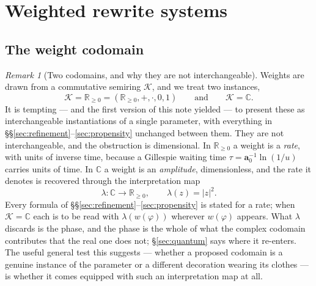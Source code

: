 \documentclass[11pt,a4paper]{article}
\theoremstyle{plain}
\theoremstyle{definition}
\theoremstyle{remark}
\newtheorem{remark}[theorem]{Remark}
\newcommand{\Rnn}{\mathbb{R}_{\geq 0}}
\newcommand{\Cx}{\mathbb{C}}
\newcommand{\prop}{\mathbf{a}}
\newcommand{\wmap}{w}
\begin{document}
\section{Weighted rewrite systems}
\label{sec:weighted}

\subsection{The weight codomain}

\begin{remark}[Two codomains, and why they are not interchangeable]
\label{rem:codomain}
Weights are drawn from a commutative semiring $\mathcal{K}$, and we treat two instances,
\[
\mathcal{K} = \Rnn = (\Rnn, +, \cdot, 0, 1)
\qquad\text{and}\qquad
\mathcal{K} = \Cx .
\]
It is tempting --- and the first version of this note yielded --- to present these as interchangeable
instantiations of a single parameter, with everything in
\S\S\ref{sec:refinement}--\ref{sec:propensity} unchanged between them. They are not interchangeable,
and the obstruction is dimensional. In $\Rnn$ a weight is a \emph{rate}, with units of inverse time,
because a Gillespie waiting time $\tau = \prop_0^{-1}\ln(1/u)$ carries units of time. In $\Cx$ a
weight is an \emph{amplitude}, dimensionless, and the rate it denotes is recovered through the
interpretation map
\[
\lambda : \Cx \longrightarrow \Rnn, \qquad \lambda(z) = |z|^2 .
\]
Every formula of \S\S\ref{sec:refinement}--\ref{sec:propensity} is stated for a rate; when
$\mathcal{K} = \Cx$ each is to be read with $\lambda(\wmap(\varphi))$ wherever $\wmap(\varphi)$
appears. What $\lambda$ discards is the phase, and the phase is the whole of what the complex
codomain contributes that the real one does not; \S\ref{sec:quantum} says where it re-enters. The
useful general test this suggests --- whether a proposed codomain is a genuine instance of the
parameter or a different decoration wearing its clothes --- is whether it comes equipped with such an
interpretation map at all.
\end{remark}
\end{document}
